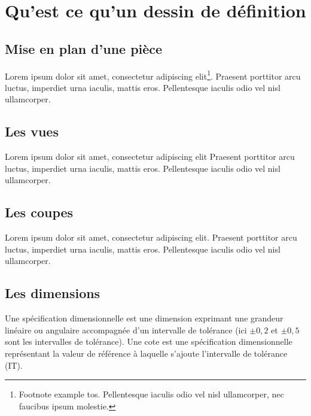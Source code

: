 \documentclass[
	11pt, %
	fleqn, %
	a4paper, %
]{LegrandOrangeBook}
\begin{document}
\section{Qu'est ce qu'un dessin de définition}
\subsection{Mise en plan d'une pièce}
Lorem ipsum dolor sit amet, consectetur adipiscing elit\footnote{Footnote example tos. Pellentesque iaculis odio vel nisl ullamcorper, nec faucibus ipsum molestie.}. Praesent porttitor arcu luctus, imperdiet urna iaculis, mattis eros. Pellentesque iaculis odio vel nisl ullamcorper.
\subsection{Les vues}
Lorem ipsum dolor sit amet, consectetur adipiscing elit Praesent porttitor arcu luctus, imperdiet urna iaculis, mattis eros. Pellentesque iaculis odio vel nisl ullamcorper.
\subsection{Les coupes}
Lorem ipsum dolor sit amet, consectetur adipiscing elit. Praesent porttitor arcu luctus, imperdiet urna iaculis, mattis eros. Pellentesque iaculis odio vel nisl ullamcorper.
\subsection{Les dimensions}
\begin{center}
\end{center}

Une {\color{blue} spécification dimensionnelle} est une dimension exprimant une grandeur linéaire ou angulaire accompagnée d’un {\color{red}intervalle de tolérance} (ici $\pm 0,2$ et $\pm 0,5$ sont les intervalles de tolérance). Une {\color{red} cote} est une spécification dimensionnelle représentant la valeur de référence à laquelle s’ajoute l’intervalle de tolérance (IT).
\end{document}
